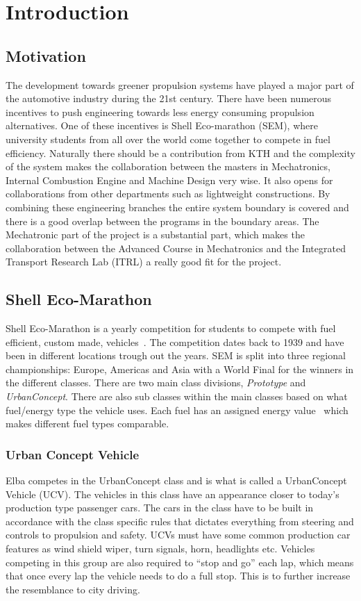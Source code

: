 \chapter{Introduction}
\section{Motivation}
The development towards greener propulsion systems have played a major part of
the automotive industry during the 21st century. There have been numerous
incentives to push engineering towards less energy consuming propulsion
alternatives. One of these incentives is Shell Eco-marathon (SEM), where
university students from all over the world come together to compete in fuel
efficiency. Naturally there should be a contribution from KTH and the complexity
of the system makes the collaboration between the masters in Mechatronics,
Internal Combustion Engine and Machine Design very wise. It also opens for collaborations from other departments such as lightweight constructions. By combining these
engineering branches the entire system boundary is covered and there is a good
overlap between the programs in the boundary areas. The Mechatronic part of the
project is a substantial part, which makes the collaboration between the
Advanced Course in Mechatronics and the Integrated Transport Research Lab (ITRL)
a really good fit for the project.

\section{Shell Eco-Marathon}
Shell Eco-Marathon is a yearly competition for students to compete with fuel
efficient, custom made, vehicles~\cite{SEM_web}. The competition dates back to
1939 and have been in different locations trough out the years. SEM is split
into three regional championships: Europe, Americas and Asia with a World Final
for the winners in the different classes. There are two main class divisions,
\textit{Prototype} and \textit{UrbanConcept}. There are also sub classes within
the main classes based on what fuel/energy type the vehicle uses. Each fuel has
an assigned energy value~\cite{semrules16c1} which makes different fuel types
comparable.

\subsection{Urban Concept Vehicle}\label{UCV}
Elba competes in the UrbanConcept class and is what is called a UrbanConcept
Vehicle (UCV). The vehicles in this class have an appearance closer to today's
production type passenger cars. The cars in the class have to be built in
accordance with the class specific rules that dictates everything from steering
and controls to propulsion and safety. UCVs must have some common production
car features as wind shield wiper, turn signals, horn, headlights etc. Vehicles
competing in this group are also required to ``stop and go'' each lap, which means
that once every lap the vehicle needs to do a full stop. This is to further
increase the resemblance to city driving.

